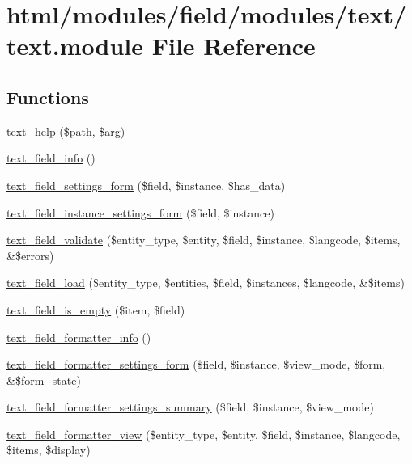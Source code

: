 \hypertarget{text_8module}{
\section{html/modules/field/modules/text/text.module File Reference}
\label{text_8module}
}
\subsection*{Functions}
\begin{DoxyCompactItemize}
\item 
\hyperlink{text_8module_ada236d36b8e686509f3de37cb66a1187}{text\_\-help} (\$path, \$arg)
\item 
\hyperlink{text_8module_a22fe4380fedbc8da50c296248104a7bf}{text\_\-field\_\-info} ()
\item 
\hyperlink{text_8module_af4495cfed6f9461e1b83b541e133a61c}{text\_\-field\_\-settings\_\-form} (\$field, \$instance, \$has\_\-data)
\item 
\hyperlink{text_8module_a50788b1f6f044d9adb396021b19e87c2}{text\_\-field\_\-instance\_\-settings\_\-form} (\$field, \$instance)
\item 
\hyperlink{text_8module_a0f6c8c7d5aef9765478ae16efeeaec5e}{text\_\-field\_\-validate} (\$entity\_\-type, \$entity, \$field, \$instance, \$langcode, \$items, \&\$errors)
\item 
\hyperlink{text_8module_a76386531217df0ac7e847c8928a29f9a}{text\_\-field\_\-load} (\$entity\_\-type, \$entities, \$field, \$instances, \$langcode, \&\$items)
\item 
\hyperlink{text_8module_a65e04fe0635223a533f9335166b45996}{text\_\-field\_\-is\_\-empty} (\$item, \$field)
\item 
\hyperlink{text_8module_afecc893fd77d050108c8256f975831ee}{text\_\-field\_\-formatter\_\-info} ()
\item 
\hyperlink{text_8module_a0eb85c2d1e0767cea7e22b00a65311a3}{text\_\-field\_\-formatter\_\-settings\_\-form} (\$field, \$instance, \$view\_\-mode, \$form, \&\$form\_\-state)
\item 
\hyperlink{text_8module_a89eae3ac39a5f54983fa7e9f04d3ac85}{text\_\-field\_\-formatter\_\-settings\_\-summary} (\$field, \$instance, \$view\_\-mode)
\item 
\hyperlink{text_8module_afc45ca296fcf7338ae6c3877b4d8b926}{text\_\-field\_\-formatter\_\-view} (\$entity\_\-type, \$entity, \$field, \$instance, \$langcode, \$items, \$display)

\end{DoxyCompactItemize}
